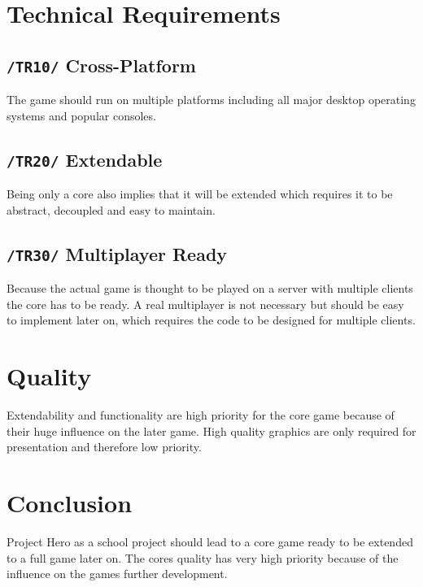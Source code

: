 \documentclass[11pt]{article}
\begin{document}
\section{Technical Requirements}\label{sec:tr}
\subsection{\texttt{/TR10/} Cross-Platform}
The game should run on multiple platforms including all major desktop operating systems and popular consoles.
\subsection{\texttt{/TR20/} Extendable}
Being only a core also implies that it will be extended which requires it to be abstract, decoupled and easy to maintain.
\subsection{\texttt{/TR30/} Multiplayer Ready}
Because the actual game is thought to be played on a server with multiple clients the core has to be ready.
A real multiplayer is not necessary but should be easy to implement later on, which requires the code to be designed for multiple clients.

\section{Quality}
Extendability and functionality are high priority for the core game because of their huge influence on the later game.
High quality graphics are only required for presentation and therefore low priority.

\section{Conclusion}
Project Hero as a school project should lead to a core game ready to be extended to a full game later on.
The cores quality has very high priority because of the influence on the games further development.
\end{document}

